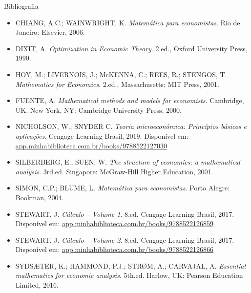 \documentclass[10pt]{beamer}
\begin{document}
\begin{frame}{Bibliografia}
    \begin{itemize}
        \item CHIANG, A.C.; WAINWRIGHT, K. \emph{Matemática para economistas}. Rio de Janeiro: Elsevier, 2006.
        \item DIXIT, A. \emph{Optimization in Economic Theory}. 2.ed., Oxford University Press, 1990.
        \item HOY, M.; LIVERNOIS, J.; McKENNA, C.; REES, R.; STENGOS, T. \emph{Mathematics for Economics}. 2.ed., Massachusetts: MIT Press, 2001.
        \item FUENTE, A. \emph{Mathematical methods and models for economists}. Cambridge, UK. New York, NY: Cambridge University Press, 2000.
        \item NICHOLSON, W.; SNYDER C. \emph{Teoria microeconômica: Princípios básicos e aplicações}. Cengage Learning Brasil, 2019. Disponível em: \href{https://app.minhabiblioteca.com.br/books/9788522127030/}{app.minhabiblioteca.com.br/books/9788522127030}
        \item SILBERBERG, E.; SUEN, W. \emph{The structure of economics: a mathematical analysis}. 3rd.ed. Singapore: McGraw-Hill Higher Education, 2001.
        \item SIMON, C.P.; BLUME, L. \emph{Matemática para economistas}. Porto Alegre: Bookman, 2004.
        \item STEWART, J. \emph{Cálculo – Volume 1}. 8.ed. Cengage Learning Brasil, 2017. Disponível em: \href{https://app.minhabiblioteca.com.br/books/9788522126859/}{app.minhabiblioteca.com.br/books/9788522126859}
        \item STEWART, J. \emph{Cálculo – Volume 2}. 8.ed. Cengage Learning Brasil, 2017. Disponível em: \href{https://app.minhabiblioteca.com.br/books/9788522126866/}{app.minhabiblioteca.com.br/books/9788522126866}
        \item SYDSÆTER, K.; HAMMOND, P.J.; STRØM, A.; CARVAJAL, A. \emph{Essential mathematics for economic analysis}. 5th.ed. Harlow, UK: Pearson Education Limited, 2016.
    \end{itemize}
\end{frame}
\end{document}
